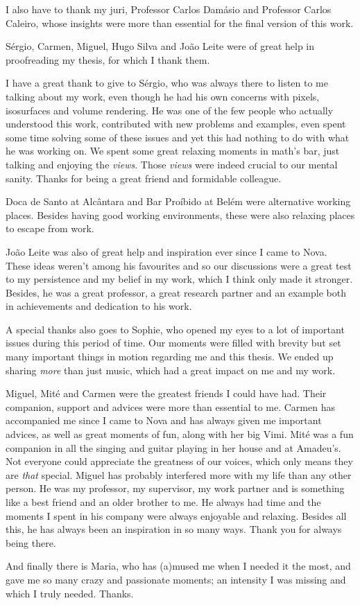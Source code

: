I also have to thank my juri, Professor Carlos Damásio and Professor Carlos Caleiro, whose insights were more than essential for the final version of this work.

Sérgio, Carmen, Miguel, Hugo Silva and João Leite were of great help in proofreading my thesis, for which I thank them.

I have a great thank to give to Sérgio, who was always there to listen to me talking about my work, even though he had his own concerns with pixels, isosurfaces and volume rendering. He was one of the few people who actually understood this work, contributed with new problems and examples, even spent some time solving some of these issues and yet this had nothing to do with what he was working on. We spent some great relaxing moments in math's bar, just talking and enjoying the \emph{views}. Those \emph{views} were indeed crucial to our mental sanity. Thanks for being a great friend and formidable colleague.

Doca de Santo at Alcântara and Bar Proíbido at Belém were alternative working places. Besides having good working environments, these were also relaxing places to escape from work.

João Leite was also of great help and inspiration ever since I came to Nova. These ideas weren't among his favourites and so our discussions were a great test to my persistence and my belief in my work, which I think only made it stronger. Besides, he was a great professor, a great research partner and an example both in achievements and dedication to his work.

A special thanks also goes to Sophie, who opened my eyes to a lot of important issues during this period of time. Our moments were filled with brevity but set many important things in motion regarding me and this thesis. We ended up sharing \emph{more} than just music, which had a great impact on me and my work.

Miguel, Mité and Carmen were the greatest friends I could have had. Their companion, support and advices were more than essential to me. Carmen has accompanied me since I came to Nova and has always given me important advices, as well as great moments of fun, along with her big Vimi. Mité was a fun companion in all the singing and guitar playing in her house and at Amadeu's. Not everyone could appreciate the greatness of our voices, which only means they are \emph{that} special. Miguel has probably interfered more with my life than any other person. He was my professor, my supervisor, my work partner and is something like a best friend and an older brother to me. He always had time and the moments I spent in his company were always enjoyable and relaxing. Besides all this, he has always been an inspiration in so many ways. Thank you for always being there.

And finally there is Maria, who has (a)mused me when I needed it the most, and gave me so many crazy and passionate moments; an intensity I was missing and which I truly needed. Thanks.